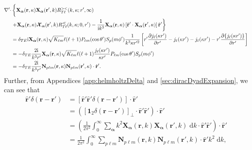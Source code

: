 \documentclass{article}
\begin{document}
\begin{equation}
\begin{split}
\nabla'\cdot&\left\{ \vphantom{\frac{1}{k^3}} \mathbf{X}_{\bm{\alpha}}(\mathbf{r},\kappa)\mathbf{X}_{\bm{\alpha}}(\mathbf{r}',k)R_{T\ell}^{><}(k,\kappa;r',\infty)\right.\\
&\left.+ \mathbf{X}_{\bm{\alpha}}(\mathbf{r},\kappa)\bm{\mathcal{X}}_{\bm{\alpha}}(\mathbf{r}',k)R_{T\ell}^\ll(k,\kappa;0,r') - \frac{1}{\mathrm{i}k^3}\mathbf{X}_{\bm{\alpha}}(\mathbf{r},\kappa)\left[\hat{\mathbf{r}}'\cdot\mathbf{X}_{\bm{\alpha}}(\mathbf{r}',\kappa)\right]\hat{\mathbf{r}}'\right\}\\
&= \delta_{TE}\mathrm{i}\mathbf{X}_{\bm{\alpha}}(\mathbf{r},\kappa)\sqrt{K_{\ell m}}\ell(\ell + 1)P_{\ell m}(\cos\theta')S_p(m\phi')\frac{1}{k^3\kappa r'^2}\left[r'\frac{\partial j_\ell(\kappa r')}{\partial r'} - j_\ell(\kappa r') - j_\ell(\kappa r') - r'\frac{\partial\{j_\ell(\kappa r')\}}{\partial r'}\right]\\
&= -\delta_{TE}\frac{2\mathrm{i}}{k^3r'}\mathbf{X}_{\bm{\alpha}}(\mathbf{r},\kappa)\sqrt{K_{\ell m}}\ell(\ell + 1)\frac{j_\ell(\kappa r')}{\kappa r'}P_{\ell m}(\cos\theta')S_p(m\phi')\\
&= -\delta_{TE}\frac{2\mathrm{i}}{k^3r'}\mathbf{N}_{p\ell m}(\mathbf{r},\kappa)\mathbf{N}_{p\ell m}(\mathbf{r}',\kappa)\cdot\hat{\mathbf{r}}'.
\end{split}
\end{equation}
Further, from Appendices \ref{app:helmholtzDelta} and \ref{sec:diracDyadExpansion}, we can see that
\begin{equation}
\begin{split}
\hat{\mathbf{r}}'\delta(\mathbf{r} - \mathbf{r}') &= \left[\hat{\mathbf{r}}'\hat{\mathbf{r}}'\delta(\mathbf{r} - \mathbf{r}')\right]\cdot\hat{\mathbf{r}}'\\
&= \left(\left[\bm{1}_2\delta(\mathbf{r} - \mathbf{r}')\right]_\perp\cdot\hat{\mathbf{r}}'\hat{\mathbf{r}}'\right)\cdot\hat{\mathbf{r}}'\\
&= \left(\frac{1}{2\pi^2}\int_0^\infty\sum_{\bm{\alpha}}k^2\mathbf{X}_{\bm{\alpha}}(\mathbf{r},k)\mathbf{X}_{\bm{\alpha}}(\mathbf{r}',k)\;\mathrm{d}k\cdot\hat{\mathbf{r}}'\hat{\mathbf{r}}'\right)\cdot\hat{\mathbf{r}}'\\
&= \frac{1}{2\pi^2}\int_0^\infty\sum_{p\ell m}\mathbf{N}_{p\ell m}(\mathbf{r},k)\mathbf{N}_{p\ell m}(\mathbf{r}',k)\cdot\hat{\mathbf{r}}'k^2\;\mathrm{d}k,
\end{split}
\end{equation}
\end{document}
